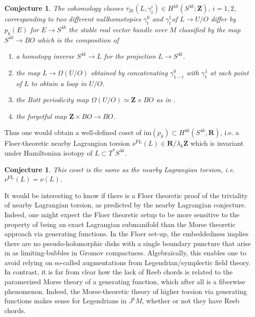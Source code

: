 \documentclass{amsart}
\def\bR{\mathbf{R}}
\def\bZ{\mathbf{Z}}
\newtheorem{conjecture}[theorem]{Conjecture}
\theoremstyle{definition}
\theoremstyle{remark}
\newtheorem{inductive lemma}[theorem]{Inductive Lemma}
\begin{document}
\begin{conjecture} The  cohomology classes $\tau_{2k}(L,\gamma_t^i) \in H^{4k}(S^{4k};\bZ)$, $i=1,2$, corresponding to two different nullhomotopies $\gamma_t^0$ and $\gamma_t^1$of $L \to U/O$ differ by $p_k(E)$ for $E \to S^{4k}$ the stable real vector bundle over $M$ classified by the map $S^{4k} \to  BO$ which is the composition of
\begin{enumerate}
\item a homotopy inverse $S^{4k} \to L$ for the projection $L \to S^{4k}$.
\item the map $L \to \Omega(U/O)$ obtained by concatenating $\gamma_{1-t}^0$ with $\gamma_t^1$ at each point of $L$ to obtain a loop in $U/O$.
\item the Bott periodicity map $\Omega(U/O) \simeq \bZ \times BO$ as in \cite{G90}.
\item the forgetful map $\bZ \times BO \to BO$.
\end{enumerate}  
\end{conjecture}

Thus one would obtain a well-defined coset of $\text{im}(p_k) \subset H^{4k}(S^{4k}, \bR)$,  i.e. a Floer-theoretic nearby Lagrangian torsion $\nu^{\text{FL}}(L) \in \bR/\lambda_k\bZ$ which is invariant under Hamiltonian isotopy of $L \subset T^*S^{4k}$. 

\begin{conjecture} This coset is the same as the nearby Lagrangian torsion, i.e. $\nu^{\text{FL}}(L)=\nu(L)$.\end{conjecture}

It would be interesting to know if there is a Floer theoretic proof of the  triviality of nearby Lagrangian torsion, as predicted by the nearby Lagrangian conjecture. Indeed, one might expect the Floer theoretic setup to be more sensitive to the property of being an exact Lagrangian submanifold than the Morse theoretic approach via generating functions. 
In the Floer set-up, the embeddedness implies there are no pseudo-holomorphic disks with a single boundary puncture that arise in as limiting-bubbles in Gromov compactness. Algebraically, this enables one to avoid relying on so-called augmentations from Legendrian/symplectic field theory.
In contrast, it is far from clear how the lack of Reeb chords is related to the paramerized Morse theory of a generating function, which after all is a fiberwise phenomenon. 
Indeed, the Morse-theoretic theory of higher torsion via generating functions makes sense for Legendrians in $J^1M$, whether or not they have Reeb chords. 
\end{document}
